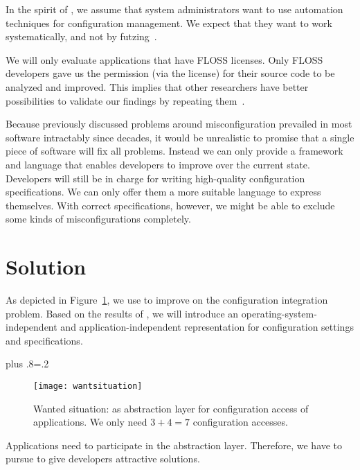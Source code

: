 In the spirit of , we assume that system administrators want to use automation techniques for configuration management.
We expect that they want to work systematically, and not by futzing~\cite{holland2001nofutz}.


We will only evaluate applications that have FLOSS licenses.
Only FLOSS developers gave us the permission (via the license) for their source code to be analyzed and improved.
This implies that other researchers have better possibilities to validate our findings by repeating them~\cite{vitek2011repeatability,blackburn2016truth}.

Because previously discussed problems around misconfiguration prevailed in most software intractably since decades, it would be unrealistic to promise that a single piece of software will fix all problems.
Instead we can only provide a framework and language that enables developers to improve over the current state.
Developers will still be in charge for writing high-quality configuration specifications.
We can only offer them a more suitable language to express themselves.
With correct specifications, however, we might be able to exclude some kinds of misconfigurations completely.










\section{Solution}

As depicted in Figure~\ref{fig:wantsituation}, we use \elektra{} to improve on the configuration integration problem.
Based on the results of , we will introduce an operating-system-independent and application-independent representation for configuration settings and specifications.%
{\parfillskip=0pt plus .8\textwidth \emergencystretch=.2\textwidth \par}

\begin{figure}[htp]
\centering
\texttt{[image: wantsituation]}
\caption[Wanted Situation.]{Wanted situation: \elektra{} as abstraction layer for configuration access of applications. We only need $3+4=7$ configuration accesses.}
\label{fig:wantsituation}
\end{figure}

Applications need to participate in the abstraction layer.
Therefore, we have to pursue  to give developers attractive solutions.

